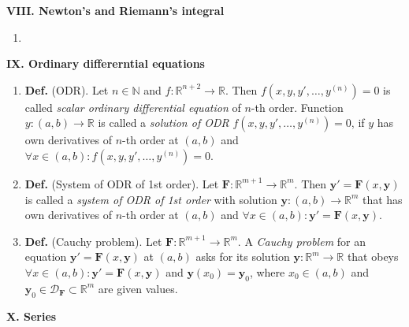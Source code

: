 \documentclass{article}
\newcommand{\<}{\left<}
\renewcommand{\>}{\right>}
\newcommand{\N}{\mathbb{N}}
\newcommand{\R}{\mathbb{R}}
\newcommand{\define}{\textbf{Def. }}
\begin{document}
\begin{multicols}{3}
\begin{enumerate}[itemsep=2pt, topsep=2pt, partopsep=2pt, parsep=2pt]
    \end{enumerate}

    \textbf{VIII. Newton's and Riemann's integral}

    \begin{enumerate}[itemsep=2pt, topsep=2pt, partopsep=2pt, parsep=2pt]

        \item

    \end{enumerate}

    \textbf{IX. Ordinary differerntial equations}

    \begin{enumerate}[itemsep=2pt, topsep=2pt, partopsep=2pt, parsep=2pt]

        \item \define (ODR). Let $n\in\N$ and $f:\R^{n+2}\to\R$. Then $f(x,y,y',\ldots,y^{(n)})=0$ is called \emph{scalar ordinary differential equation} of $n$-th order. Function $y:(a,b)\to\R$ is called a \emph{solution of ODR} $f(x,y,y',\ldots,y^{(n)})=0$, if $y$ has own derivatives of $n$-th order at $(a,b)$ and $\forall x\in(a,b):f(x,y,y',\ldots,y^{(n)})=0$.
        \item \define (System of ODR of 1st order). Let $\bm F:\R^{m+1}\to\R^m$. Then $\bm y'=\bm F(x,\bm y)$ is called a \emph{system of ODR of 1st order} with solution $\bm y:(a,b)\to\R^m$ that has own derivatives of $n$-th order at $(a,b)$ and $\forall x\in(a,b):\bm y'=\bm F(x,\bm y)$.
        \item \define (Cauchy problem). Let $\bm F:\R^{m+1}\to\R^m$. A \emph{Cauchy problem} for an equation $\bm y'=\bm F(x,\bm y)$ at $(a,b)$ asks for its solution $\bm y:\R^m\to\R$ that obeys $\forall x\in(a,b):\bm y'=\bm F(x,\bm y)$ and $\bm y(x_0)=\bm y_0$, where $x_0\in(a,b)$ and $\bm y_0\in{\mathcal D_{\bm F}}\subset\R^m$ are given values.
        

    \end{enumerate}

    \textbf{X. Series}

    \begin{enumerate}[itemsep=2pt, topsep=2pt, partopsep=2pt, parsep=2pt]


\end{enumerate}
\end{multicols}
\end{document}
